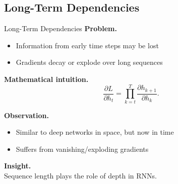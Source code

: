 \documentclass[aspectratio=169,11pt]{beamer}
\begin{document}
\subsection{Long-Term Dependencies}
\begin{frame}[t,allowframebreaks]{Long-Term Dependencies}
\small
\textbf{Problem.}\\ \begin{itemize}
    \item Information from early time steps may be lost
    \item Gradients decay or explode over long sequences
\end{itemize}

\textbf{Mathematical intuition.}\\ \[
\frac{\partial L}{\partial h_t}
= \prod_{k=t}^{T} \frac{\partial h_{k+1}}{\partial h_k}.
\]

\textbf{Observation.}\\ \begin{itemize}
    \item Similar to deep networks in space, but now in time
    \item Suffers from vanishing/exploding gradients
\end{itemize}

\textbf{Insight.}\\ Sequence length plays the role of depth in RNNs.
\end{frame}
\end{document}
